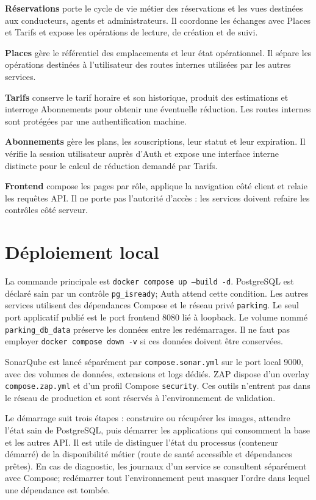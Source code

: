 \documentclass[11pt,a4paper]{report}
\begin{document}
\textbf{Réservations} porte le cycle de vie métier des réservations et les vues destinées aux conducteurs, agents et administrateurs. Il coordonne les échanges avec Places et Tarifs et expose les opérations de lecture, de création et de suivi.

\textbf{Places} gère le référentiel des emplacements et leur état opérationnel. Il sépare les opérations destinées à l'utilisateur des routes internes utilisées par les autres services.

\textbf{Tarifs} conserve le tarif horaire et son historique, produit des estimations et interroge Abonnements pour obtenir une éventuelle réduction. Les routes internes sont protégées par une authentification machine.

\textbf{Abonnements} gère les plans, les souscriptions, leur statut et leur expiration. Il vérifie la session utilisateur auprès d'Auth et expose une interface interne distincte pour le calcul de réduction demandé par Tarifs.

\textbf{Frontend} compose les pages par rôle, applique la navigation côté client et relaie les requêtes API. Il ne porte pas l'autorité d'accès : les services doivent refaire les contrôles côté serveur.

\section{Déploiement local}
La commande principale est \texttt{docker compose up --build -d}. PostgreSQL est déclaré sain par un contrôle \texttt{pg\_isready}; Auth attend cette condition. Les autres services utilisent des dépendances Compose et le réseau privé \texttt{parking}. Le seul port applicatif publié est le port frontend 8080 lié à loopback. Le volume nommé \texttt{parking\_db\_data} préserve les données entre les redémarrages. Il ne faut pas employer \texttt{docker compose down -v} si ces données doivent être conservées.

SonarQube est lancé séparément par \texttt{compose.sonar.yml} sur le port local 9000, avec des volumes de données, extensions et logs dédiés. ZAP dispose d'un overlay \texttt{compose.zap.yml} et d'un profil Compose \texttt{security}. Ces outils n'entrent pas dans le réseau de production et sont réservés à l'environnement de validation.

Le démarrage suit trois étapes : construire ou récupérer les images, attendre l'état sain de PostgreSQL, puis démarrer les applications qui consomment la base et les autres API. Il est utile de distinguer l'état du processus (conteneur démarré) de la disponibilité métier (route de santé accessible et dépendances prêtes). En cas de diagnostic, les journaux d'un service se consultent séparément avec Compose; redémarrer tout l'environnement peut masquer l'ordre dans lequel une dépendance est tombée.
\end{document}
